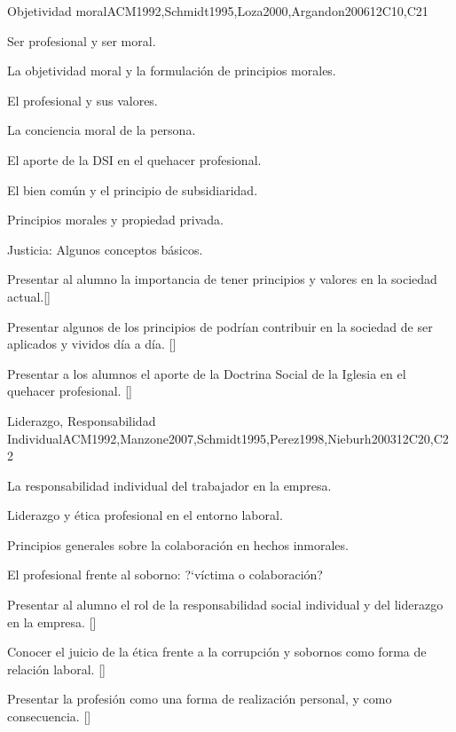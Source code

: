 \begin{syllabus}
\begin{unit}{Objetividad moral}{}{ACM1992,Schmidt1995,Loza2000,Argandon2006}{12}{C10,C21}
\begin{topics}
	\item Ser profesional y ser moral.
	\item La objetividad moral y la formulación de principios morales.
	\item El profesional y sus valores.
	\item La conciencia moral de la persona.
	\item El aporte de la DSI en el quehacer profesional.
	\item El bien común y el principio de subsidiaridad.
	\item Principios morales y propiedad privada.
	\item Justicia: Algunos conceptos básicos.
\end{topics}
\begin{learningoutcomes}
	\item Presentar al alumno la importancia de tener principios y valores en la sociedad actual.[\Usage]
	\item Presentar algunos de los principios de podrían contribuir en la sociedad de ser aplicados y vividos día a día. [\Usage]
	\item Presentar a los alumnos el aporte de la Doctrina Social de la Iglesia en el quehacer profesional. [\Usage]
\end{learningoutcomes}
\end{unit}

\begin{unit}{}{Liderazgo, Responsabilidad Individual}{ACM1992,Manzone2007,Schmidt1995,Perez1998,Nieburh2003}{12}{C20,C22}
\begin{topics}
	\item La responsabilidad individual del trabajador en la empresa.
	\item Liderazgo y ética profesional en el entorno laboral.
	\item Principios generales sobre la colaboración en hechos inmorales.
	\item El profesional frente al soborno: ?`víctima o colaboración?

\end{topics}
\begin{learningoutcomes}
	\item Presentar al alumno el rol de la responsabilidad social individual y del liderazgo en la empresa. [\Familiarity]
	\item Conocer el juicio de la ética frente a la corrupción y sobornos como forma de relación laboral. [\Familiarity]
	\item Presentar la profesión como una forma de realización personal, y como consecuencia. []
\end{learningoutcomes}
\end{unit}


\end{syllabus}
